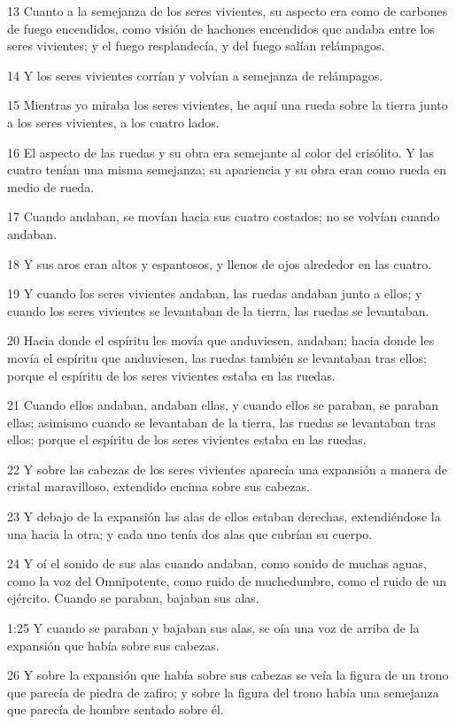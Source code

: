 \par 13 Cuanto a la semejanza de los seres vivientes, su aspecto era como de carbones de fuego encendidos, como visión de hachones encendidos que andaba entre los seres vivientes; y el fuego resplandecía, y del fuego salían relámpagos.
\par 14 Y los seres vivientes corrían y volvían a semejanza de relámpagos.
\par 15 Mientras yo miraba los seres vivientes, he aquí una rueda sobre la tierra junto a los seres vivientes, a los cuatro lados.
\par 16 El aspecto de las ruedas y su obra era semejante al color del crisólito. Y las cuatro tenían una misma semejanza; su apariencia y su obra eran como rueda en medio de rueda.
\par 17 Cuando andaban, se movían hacia sus cuatro costados; no se volvían cuando andaban.
\par 18 Y sus aros eran altos y espantosos, y llenos de ojos alrededor en las cuatro.
\par 19 Y cuando los seres vivientes andaban, las ruedas andaban junto a ellos; y cuando los seres vivientes se levantaban de la tierra, las ruedas se levantaban.
\par 20 Hacia donde el espíritu les movía que anduviesen, andaban; hacia donde les movía el espíritu que anduviesen, las ruedas también se levantaban tras ellos; porque el espíritu de los seres vivientes estaba en las ruedas.
\par 21 Cuando ellos andaban, andaban ellas, y cuando ellos se paraban, se paraban ellas; asimismo cuando se levantaban de la tierra, las ruedas se levantaban tras ellos; porque el espíritu de los seres vivientes estaba en las ruedas. 
\par 22 Y sobre las cabezas de los seres vivientes aparecía una expansión a manera de cristal maravilloso, extendido encima sobre sus cabezas.
\par 23 Y debajo de la expansión las alas de ellos estaban derechas, extendiéndose la una hacia la otra; y cada uno tenía dos alas que cubrían su cuerpo.
\par 24 Y oí el sonido de sus alas cuando andaban, como sonido de muchas aguas, como la voz del Omnipotente, como ruido de muchedumbre, como el ruido de un ejército. Cuando se paraban, bajaban sus alas.
\par 1:25 Y cuando se paraban y bajaban sus alas, se oía una voz de arriba de la expansión que había sobre sus cabezas.
\par 26 Y sobre la expansión que había sobre sus cabezas se veía la figura de un trono que parecía de piedra de zafiro; y sobre la figura del trono había una semejanza que parecía de hombre sentado sobre él. 
